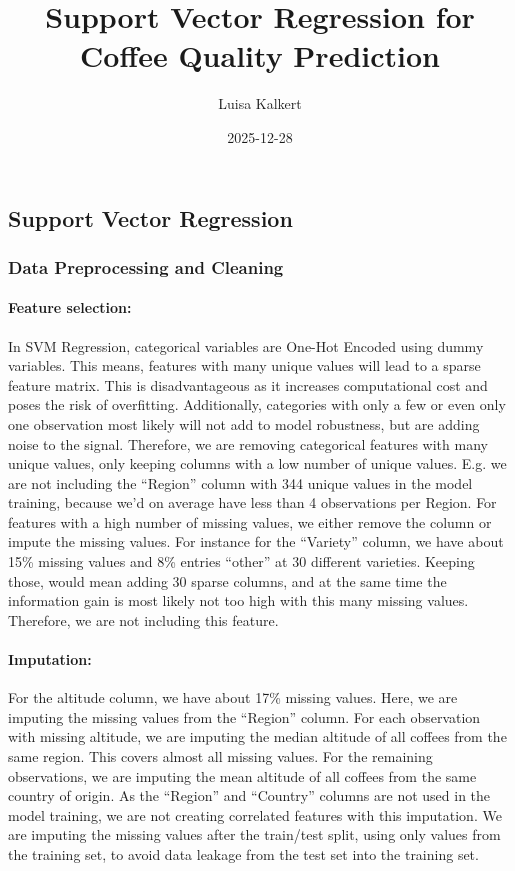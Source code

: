 \documentclass[
]{article}
\title{Support Vector Regression for Coffee Quality Prediction}
\author{Luisa Kalkert}
\date{2025-12-28}
\begin{document}
\maketitle

\subsection{Support Vector Regression}\label{support-vector-regression}

\subsubsection{Data Preprocessing and
Cleaning}\label{data-preprocessing-and-cleaning}

\paragraph{Feature selection:}\label{feature-selection}

In SVM Regression, categorical variables are One-Hot Encoded using dummy
variables. This means, features with many unique values will lead to a
sparse feature matrix. This is disadvantageous as it increases
computational cost and poses the risk of overfitting. Additionally,
categories with only a few or even only one observation most likely will
not add to model robustness, but are adding noise to the signal.
Therefore, we are removing categorical features with many unique values,
only keeping columns with a low number of unique values. E.g. we are not
including the ``Region'' column with 344 unique values in the model
training, because we'd on average have less than 4 observations per
Region. For features with a high number of missing values, we either
remove the column or impute the missing values. For instance for the
``Variety'' column, we have about 15\% missing values and 8\% entries
``other'' at 30 different varieties. Keeping those, would mean adding 30
sparse columns, and at the same time the information gain is most likely
not too high with this many missing values. Therefore, we are not
including this feature.

\paragraph{Imputation:}\label{imputation}

For the altitude column, we have about 17\% missing values. Here, we are
imputing the missing values from the ``Region'' column. For each
observation with missing altitude, we are imputing the median altitude
of all coffees from the same region. This covers almost all missing
values. For the remaining observations, we are imputing the mean
altitude of all coffees from the same country of origin. As the
``Region'' and ``Country'' columns are not used in the model training,
we are not creating correlated features with this imputation. We are
imputing the missing values after the train/test split, using only
values from the training set, to avoid data leakage from the test set
into the training set.
\end{document}
